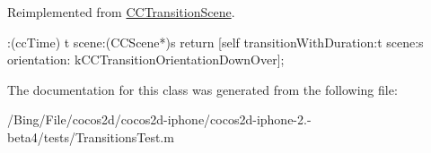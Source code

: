 Reimplemented from \hyperlink{interface_c_c_transition_scene_af49d7862a7560b4b4954dda1363cfa28}{C\-C\-Transition\-Scene}.


\begin{DoxyCode}
                            :(ccTime) t scene:(CCScene*)s {
        return [self transitionWithDuration:t scene:s orientation:
      kCCTransitionOrientationDownOver];
}
\end{DoxyCode}


The documentation for this class was generated from the following file\-:\begin{DoxyCompactItemize}
\item 
/\-Bing/\-File/cocos2d/cocos2d-\/iphone/cocos2d-\/iphone-\/2.-\/beta4/tests/Transitions\-Test.\-m\end{DoxyCompactItemize}
